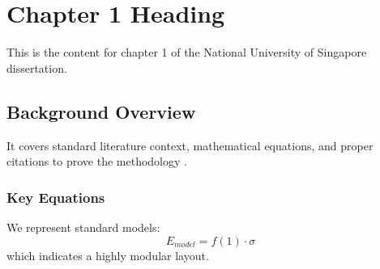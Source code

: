 \chapter{Chapter 1 Heading}
\label{ch:chapter1}
This is the content for chapter 1 of the National University of Singapore dissertation.

\section{Background Overview}
It covers standard literature context, mathematical equations, and proper citations to prove the methodology \cite{texbook}.

\subsection{Key Equations}
We represent standard models:
\begin{equation}
    E_{model} = f(1) \cdot \sigma
\end{equation}
which indicates a highly modular layout.
